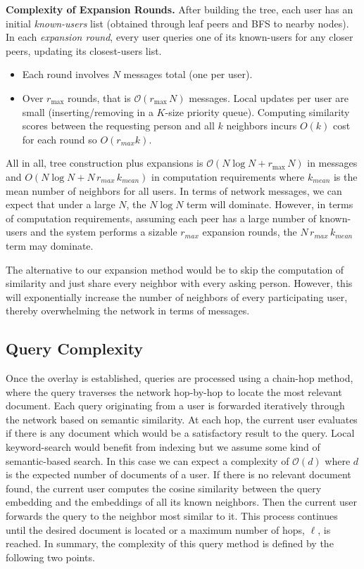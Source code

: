\documentclass[10pt,journal]{IEEEtran}
\begin{document}
\textbf{Complexity of Expansion Rounds.}
After building the tree, each user has an initial \textit{known-users} list (obtained through leaf peers and BFS to nearby nodes). In each \emph{expansion round}, every user queries one of its known-users for any closer peers, updating its closest-users list.
\begin{itemize}
    \item Each round involves $N$ messages total (one per user).
    \item Over $r_{\max}$ rounds, that is $\mathcal{O}(r_{\max} \, N)$ messages. Local updates per user are small (inserting/removing in a $K$-size priority queue). Computing similarity scores between the requesting person and all $k$ neighbors incurs $O(k)$ cost for each round so $O(r_{max}k)$.
\end{itemize}
All in all, tree construction plus expansions is $\mathcal{O}(N \log N + r_{\max} \, N)$ in messages and $O(N \log N + N \, r_{max} \, k_{mean})$ in computation requirements where $k_{mean}$ is the mean number of neighbors for all users. In terms of network messages, we can expect that under a large $N$, the $N \log N$ term will dominate. However, in terms of computation requirements, assuming each peer has a large number of known-users and the system performs a sizable $r_{max}$ expansion rounds, the $N \, r_{max} \, k_{mean}$ term may dominate. 

The alternative to our expansion method would be to skip the computation of similarity and just share every neighbor with every asking person. However, this will exponentially increase the number of neighbors of every participating user, thereby overwhelming the network in terms of messages.

\subsection{Query Complexity}

Once the overlay is established, queries are processed using a chain-hop method, where the query traverses the network hop-by-hop to locate the most relevant document. Each query originating from a user is forwarded iteratively through the network based on semantic similarity. At each hop, the current user evaluates if there is any document which would be a satisfactory result to the query. Local keyword-search would benefit from indexing but we assume some kind of semantic-based search. In this case we can expect a complexity of $ \mathcal{O}(d)$ where $d$ is the expected number of documents of a user. If there is no relevant document found, the current user computes the cosine similarity between the query embedding and the embeddings of all its known neighbors. Then the current user forwards the query to the neighbor most similar to it. This process continues until the desired document is located or a maximum number of hops, \(\ell\), is reached.
In summary, the complexity of this query method is defined by the following two points.
\end{document}
